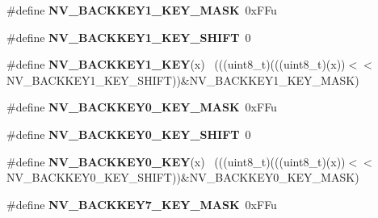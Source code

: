 \begin{DoxyCompactItemize}
\item 
\hypertarget{group___n_v___register___masks_ga6cd05d78b113df7f3cb0d11d29931666}{}\#define {\bfseries N\+V\+\_\+\+B\+A\+C\+K\+K\+E\+Y1\+\_\+\+K\+E\+Y\+\_\+\+M\+A\+S\+K}~0x\+F\+Fu\label{group___n_v___register___masks_ga6cd05d78b113df7f3cb0d11d29931666}

\item 
\hypertarget{group___n_v___register___masks_ga71418f17e11f902066ca404fbe473aef}{}\#define {\bfseries N\+V\+\_\+\+B\+A\+C\+K\+K\+E\+Y1\+\_\+\+K\+E\+Y\+\_\+\+S\+H\+I\+F\+T}~0\label{group___n_v___register___masks_ga71418f17e11f902066ca404fbe473aef}

\item 
\hypertarget{group___n_v___register___masks_gacd7a10179786650c77f0f094f6840a3c}{}\#define {\bfseries N\+V\+\_\+\+B\+A\+C\+K\+K\+E\+Y1\+\_\+\+K\+E\+Y}(x)                                          ~(((uint8\+\_\+t)(((uint8\+\_\+t)(x))$<$$<$N\+V\+\_\+\+B\+A\+C\+K\+K\+E\+Y1\+\_\+\+K\+E\+Y\+\_\+\+S\+H\+I\+F\+T))\&N\+V\+\_\+\+B\+A\+C\+K\+K\+E\+Y1\+\_\+\+K\+E\+Y\+\_\+\+M\+A\+S\+K)\label{group___n_v___register___masks_gacd7a10179786650c77f0f094f6840a3c}

\item 
\hypertarget{group___n_v___register___masks_gafa0e31ca33d445d47d2fd89785e4ec9b}{}\#define {\bfseries N\+V\+\_\+\+B\+A\+C\+K\+K\+E\+Y0\+\_\+\+K\+E\+Y\+\_\+\+M\+A\+S\+K}~0x\+F\+Fu\label{group___n_v___register___masks_gafa0e31ca33d445d47d2fd89785e4ec9b}

\item 
\hypertarget{group___n_v___register___masks_ga381e2b0a778da31fa6c795550e71aed8}{}\#define {\bfseries N\+V\+\_\+\+B\+A\+C\+K\+K\+E\+Y0\+\_\+\+K\+E\+Y\+\_\+\+S\+H\+I\+F\+T}~0\label{group___n_v___register___masks_ga381e2b0a778da31fa6c795550e71aed8}

\item 
\hypertarget{group___n_v___register___masks_ga119a9432df0049c7606825aee3a20f31}{}\#define {\bfseries N\+V\+\_\+\+B\+A\+C\+K\+K\+E\+Y0\+\_\+\+K\+E\+Y}(x)                                          ~(((uint8\+\_\+t)(((uint8\+\_\+t)(x))$<$$<$N\+V\+\_\+\+B\+A\+C\+K\+K\+E\+Y0\+\_\+\+K\+E\+Y\+\_\+\+S\+H\+I\+F\+T))\&N\+V\+\_\+\+B\+A\+C\+K\+K\+E\+Y0\+\_\+\+K\+E\+Y\+\_\+\+M\+A\+S\+K)\label{group___n_v___register___masks_ga119a9432df0049c7606825aee3a20f31}

\item 
\hypertarget{group___n_v___register___masks_gac3f2bc7dd55b7951d70a5d1fcb6552b8}{}\#define {\bfseries N\+V\+\_\+\+B\+A\+C\+K\+K\+E\+Y7\+\_\+\+K\+E\+Y\+\_\+\+M\+A\+S\+K}~0x\+F\+Fu\label{group___n_v___register___masks_gac3f2bc7dd55b7951d70a5d1fcb6552b8}


\end{DoxyCompactItemize}
